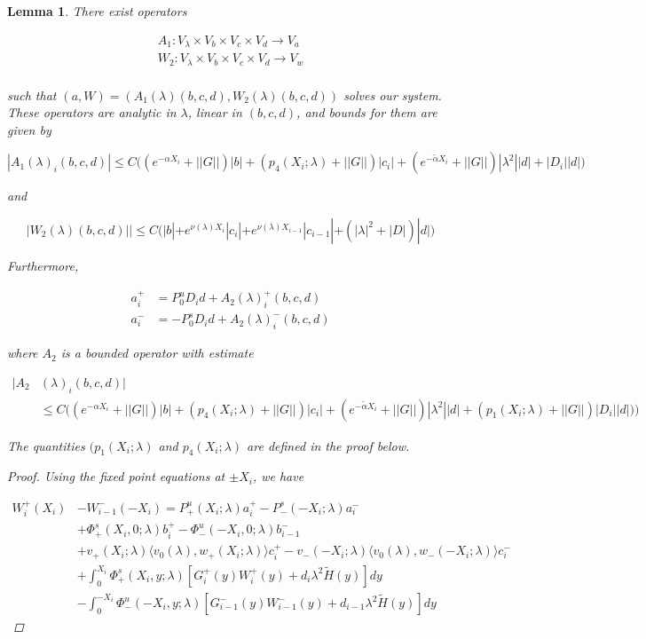 \documentclass[12pt]{article}
\newtheorem{lemma}{Lemma}
\begin{document}
\begin{lemma}
There exist operators

\begin{align*}
A_1: V_\lambda \times V_b \times V_c \times V_d \rightarrow V_a \\
W_2: V_\lambda \times V_b \times V_c \times V_d \rightarrow V_w \\
\end{align*}

such that $(a,W) = ( A_1(\lambda)(b,c,d), W_2(\lambda)(b,c,d) )$ solves our system. These operators are analytic in $\lambda$, linear in $(b,c,d)$, and bounds for them are given by

\begin{equation}
|A_1(\lambda)_i(b, c, d)| \leq C \Big( (e^{-\alpha X_i} + ||G||) |b| + ( p_4(X_i; \lambda) + ||G|| )|c_i|
+ (e^{-\tilde{\alpha} X_i} + ||G||) |\lambda^2| |d| + |D_i||d| \Big)
\end{equation} 

and

\begin{equation}
|W_2(\lambda)(b,c,d)|| 
\leq C \Big( |b| + e^{\nu(\lambda)X_i}|c_i| + e^{\nu(\lambda)X_{i-1}}|c_{i-1}| + (|\lambda|^2 + |D|)|d| \Big)
\end{equation} 

Furthermore, 

\begin{align*}
a_i^+ &= P^u_0 D_i d + A_2(\lambda)_i^+(b, c, d) \\
a_i^- &= -P^s_0 D_i d + A_2(\lambda)_i^-(b, c, d)
\end{align*}

where $A_2$ is a bounded operator with estimate

\begin{align*}
|A_2&(\lambda)_i(b, c, d)| \\
&\leq C \Big( (e^{-\alpha X_i} + ||G||)|b| + ( p_4(X_i; \lambda) + ||G|| )|c_i| + (e^{-\tilde{\alpha} X_i} + ||G||) |\lambda^2| |d| + (p_1(X_i; \lambda) + ||G|| )|D_i||d|) \Big)
\end{align*}

The quantities $(p_1(X_i; \lambda)$ and $p_4(X_i; \lambda)$ are defined in the proof below. 

\begin{proof}

Using the fixed point equations at $\pm X_i$, we have

\begin{align*}
W_i^+(X_i) &- W_{i-1}^-(-X_i) = P^u_+(X_i; \lambda) a_i^+ - P^s_-(-X_i; \lambda) a_i^- \\
&+ \Phi^s_+(X_i, 0; \lambda)b_i^+ - \Phi^u_-(-X_i, 0; \lambda)b_{i-1}^- \\
&+ v_+(X_i; \lambda) \langle v_0(\lambda), w_+(X_i; \lambda) \rangle c_i^+ - v_-(-X_i; \lambda) \langle v_0(\lambda), w_-(-X_i; \lambda) \rangle c_i^- \\
&+ \int_0^{X_i} \Phi^s_+(X_i, y; \lambda) [ G_i^+(y) W_i^+(y) + d_i \lambda^2 \tilde{H}(y) ] dy \\
&- \int_0^{-X_i} \Phi^u_-(-X_i, y; \lambda) [ G_{i-1}^-(y) W_{i-1}^-(y) + d_{i-1} \lambda^2 \tilde{H}(y) ] dy
\end{align*}


\end{proof}
\end{lemma}
\end{document}

